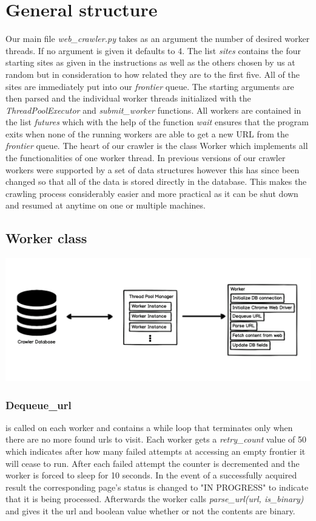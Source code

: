 \documentclass[runningheads]{llncs}
\begin{document}
\section{General structure}
Our main file \textit{web\_crawler.py} takes as an argument the number of desired worker threads. If no argument is given it defaults to 4. The list \textit{sites} contains the four starting sites as given in the instructions as well as the others chosen by us at random but in consideration to how related they are to the first five. All of the sites are immediately put into our \textit{frontier} queue. The starting arguments are then parsed and the individual worker threads initialized with the \textit{ThreadPoolExecutor} and \textit{submit\_worker} functions. All workers are contained in the list \textit{futures} which with the help of the function \textit{wait} ensures that the program exits when none of the running workers are able to get a new URL from the \textit{frontier} queue.
The heart of our crawler is the class Worker which implements all the functionalities of one worker thread. In previous versions of our crawler workers were supported by a set of data structures however this has since been changed so that all of the data is stored directly in the database. This makes the crawling process considerably easier and more practical as it can be shut down and resumed at anytime on one or multiple machines.

\subsection{Worker class}

\includegraphics[scale=0.2]{flow_chart.png}
\subsubsection{Dequeue\_url}
is called on each worker and contains a while loop that terminates only when there are no more found urls to visit. Each worker gets a \textit{retry\_count} value of 50 which indicates after how many failed attempts at accessing an empty frontier it will cease to run. After each failed attempt the counter is decremented and the worker is forced to sleep for 10 seconds. In the event of a successfully acquired result the corresponding page's status is changed to "IN PROGRESS" to indicate that it is being processed. Afterwards the worker calls \textit{parse\_url(url, is\_binary)} and gives it the url and boolean value whether or not the contents are binary. 
\end{document}
